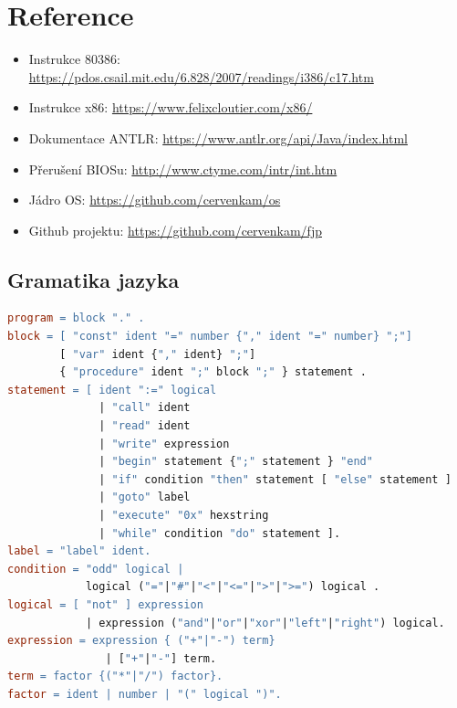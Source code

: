 \documentclass[a4paper]{article}
\begin{document}
\section{Reference}
\begin{itemize}
\item Instrukce 80386: \url{https://pdos.csail.mit.edu/6.828/2007/readings/i386/c17.htm}
\item Instrukce x86: \url{https://www.felixcloutier.com/x86/}
\item Dokumentace ANTLR: \url{https://www.antlr.org/api/Java/index.html}
\item P\v{r}eru\v{s}en\'i BIOSu: \url{http://www.ctyme.com/intr/int.htm}
\item J\'adro OS: \url{https://github.com/cervenkam/os}
\item Github projektu: \url{https://github.com/cervenkam/fjp}
\end{itemize}
\clearpage
\appendix
\begin{landscape}
\section{Gramatika jazyka}\label{app:gram}
\begin{lstlisting}[language=make]
program = block "." .
block = [ "const" ident "=" number {"," ident "=" number} ";"]
        [ "var" ident {"," ident} ";"]
        { "procedure" ident ";" block ";" } statement .
statement = [ ident ":=" logical
              | "call" ident 
              | "read" ident
              | "write" expression 
              | "begin" statement {";" statement } "end" 
              | "if" condition "then" statement [ "else" statement ]
              | "goto" label
              | "execute" "0x" hexstring
              | "while" condition "do" statement ].
label = "label" ident.
condition = "odd" logical |
            logical ("="|"#"|"<"|"<="|">"|">=") logical .
logical = [ "not" ] expression
            | expression ("and"|"or"|"xor"|"left"|"right") logical.
expression = expression { ("+"|"-") term}
               | ["+"|"-"] term.
term = factor {("*"|"/") factor}.
factor = ident | number | "(" logical ")".
\end{lstlisting}
\end{landscape}
\clearpage
\end{document}
